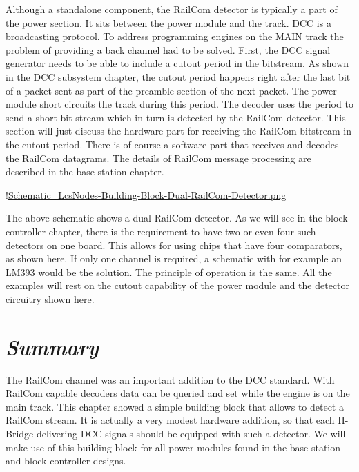 
Although a standalone component, the RailCom detector is typically a part of the power section. It sits between the power module and the track. DCC is a broadcasting protocol. To address programming engines on the MAIN track the problem of providing a back channel had to be solved. First, the DCC signal generator needs to be able to include a cutout period in the bitstream. As shown in the DCC subsystem chapter, the cutout period happens right after the last bit of a packet sent as part of the preamble section of the next packet. The power module short circuits the track during this period. The decoder uses the period to send a short bit stream which in turn is detected by the RailCom detector. This section will just discuss the hardware part for receiving the RailCom bitstream in the cutout period. There is of course a software part that receives and decodes the RailCom datagrams. The details of RailCom message processing are described in the base station chapter.

!\href{./Schematics/Schematic_LcsNodes-Building-Block-Dual-RailCom-Detector.png }{Schematic_LcsNodes-Building-Block-Dual-RailCom-Detector.png}

The above schematic shows a dual RailCom detector. As we will see in the block controller chapter, there is the requirement to have two or even four such detectors on one board. This allows for using chips that have four comparators, as shown here. If only one channel is required, a schematic with for example an LM393 would be the solution. The principle of operation is the same. All the examples will rest on the cutout capability of the power module and the detector circuitry shown here.

\section{\textit{Summary}}

The RailCom channel was an important addition to the DCC standard. With RailCom capable decoders data can be queried and set while the engine is on the main track. This chapter showed a simple building block that allows to detect a RailCom stream. It is actually a very modest hardware addition, so that each H-Bridge delivering DCC signals should be equipped with such a detector. We will make use of this building block for all power modules found in the base station and block controller designs.
